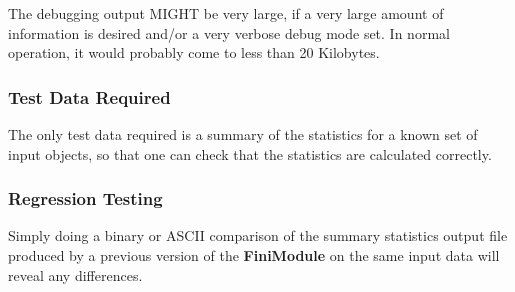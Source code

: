   The debugging output MIGHT be very large, if a very
large amount of information is desired and/or a very verbose
debug mode set.  In normal operation, it would probably 
come to less than 20 Kilobytes.

\subsubsection {Test Data Required}

  The only test data required is a summary of the 
statistics for a known set of input objects, so that
one can check that the statistics are calculated correctly.

\subsubsection {Regression Testing}

  Simply doing a binary or ASCII comparison of the 
summary statistics output file produced by a previous
version of the {\bf FiniModule} on the same 
input data will reveal any differences.



